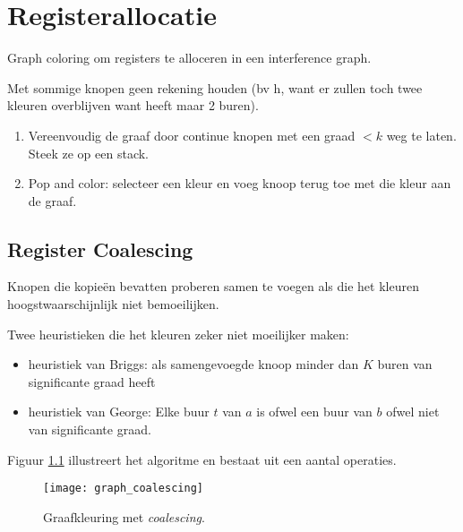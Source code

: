 \chapter{Registerallocatie}
Graph coloring om registers te alloceren in een interference graph.


Met sommige knopen geen rekening houden (bv h, want er zullen toch twee kleuren overblijven want heeft maar 2 buren).

\begin{enumerate}
	\item Vereenvoudig de graaf door continue knopen met een graad $< k$ weg te laten. Steek ze op een stack.
	\item Pop and color: selecteer een kleur en voeg knoop terug toe met die kleur aan de graaf.
\end{enumerate} 

\section{Register Coalescing}
Knopen die kopieën bevatten proberen samen te voegen als die het kleuren hoogstwaarschijnlijk niet bemoeilijken.

Twee heuristieken die het kleuren zeker niet moeilijker maken:
\begin{itemize}
	\item heuristiek van Briggs: als samengevoegde knoop minder dan $K$ buren van significante graad heeft
	\item heuristiek van George: Elke buur $t$ van $a$ is ofwel een buur van $b$ ofwel niet van significante graad.
\end{itemize}

Figuur \ref{fig:graph_coalescing} illustreert het algoritme en bestaat uit een aantal operaties.

\begin{figure}
	\texttt{[image: graph\_coalescing]}
	\caption{Graafkleuring met \textit{coalescing}.}
	\label{fig:graph_coalescing}
\end{figure}

